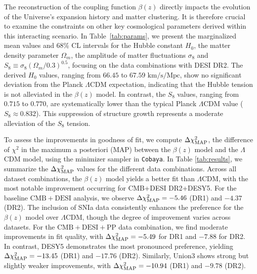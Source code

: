\documentclass[a4paper,11pt]{article}
\begin{document}
{The reconstruction of the coupling function $\beta(z)$ directly impacts the evolution of the Universe's expansion history and matter clustering. It is therefore crucial to examine the constraints on other key cosmological parameters derived within this interacting scenario. In Table~\ref{tab:params}, we present the marginalized mean values and 68\% CL intervals for the Hubble constant $H_0$, the matter density parameter $\Omega_m$, the amplitude of matter fluctuations $\sigma_8$ and $S_8\equiv \sigma_8(\Omega_m/0.3)^{0.5}$, focusing on the data combinations with DESI DR2. The derived $H_0$ values, ranging from $66.45$ to $67.59$ $\mathrm{km/s/Mpc}$, show no significant deviation from the Planck $\Lambda$CDM expectation, indicating that the Hubble tension is not alleviated in the $\beta(z)$ model. In contrast, the $S_8$ values, ranging from $0.715$ to $0.770$, are systematically lower than the typical Planck $\Lambda$CDM value ($S_8 \approx 0.832$). This suppression of structure growth represents a moderate alleviation of the $S_8$ tension.}

To assess the improvements in goodness of fit, we compute $\Delta\chi_{\rm MAP}^2$, the difference of $\chi^2$ in the maximum a posteriori (MAP) between the $\beta(z)$ model and the $\Lambda$CDM model, using the minimizer sampler \cite{BOBYQA,Cartis:2018xum,Cartis:2018jxl} in {\tt Cobaya}. In Table \ref{tab:results}, we summarize the $\Delta\chi_{\rm MAP}^2$ values for the different data combinations. Across all dataset combinations, the $\beta(z)$ model yields a better fit than $\Lambda$CDM, with the most notable improvement occurring for CMB+DESI DR2+DESY5. For the baseline $\mathrm{CMB}+\mathrm{DESI}$ analysis, we observe $\Delta\chi_{\rm MAP}^2 = -5.46$ (DR1) and $-4.37$ (DR2). The inclusion of SNIa data consistently enhances the preference for the $\beta(z)$ model over $\Lambda$CDM, though the degree of improvement varies across datasets. For the $\mathrm{CMB}+\mathrm{DESI}+\mathrm{PP}$ data combination, we find moderate improvements in fit quality, with $\Delta\chi_{\rm MAP}^2 = -5.49$ for DR1 and $-7.88$ for DR2. In contrast, DESY5 demonstrates the most pronounced preference, yielding $\Delta\chi_{\rm MAP}^2 = -13.45$ (DR1) and $-17.76$ (DR2). Similarly, Union3 shows strong but slightly weaker improvements, with $\Delta\chi_{\rm MAP}^2 = -10.94$ (DR1) and $-9.78$ (DR2). 
\end{document}
